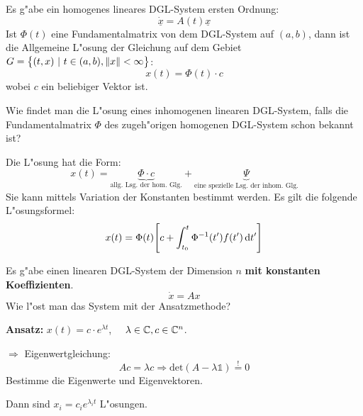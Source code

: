 \documentclass[9pt]{article}
\newcommand{\C}[1]{%
	\ifthenelse{\equal{#1}{}}
	{\mathbb{C}}
	{\mathbb{C}^{#1}}}%
\renewcommand{\vec}[1]{\underline{#1}}
\newenvironment{field}{}{\newpage}
\newif\ifnote
\newenvironment{note}{\notetrue}{\notefalse}
\newcommand{\localtag}{}
\newcommand{\globaltag}{}
\newcommand{\uuid}{}
\newcommand{\tags}[1]{
    \ifnote 
        \renewcommand{\localtag}{#1}
    \else
        \renewcommand{\globaltag}{#1}
    \fi 
    }
\newcommand{\xplain}[1]{\renewcommand{\uuid}{#1}}
\begin{document}
\begin{note}
	\begin{field}  %
		Es g"abe ein homogenes lineares DGL-System  ersten Ordnung:
		\begin{equation*}
		\dot{\vec{x}} = A(t)\vec{x} 
		\end{equation*}
		Ist $\Phi(t)$ eine Fundamentalmatrix von dem DGL-System auf $(a,b)$, dann ist die Allgemeine L"osung der Gleichung auf dem Gebiet $G=\qty{(t,x) \ | \ t\in(a,b), \norm{x} < \infty}$:
		\begin{equation*}
			x(t)= \Phi(t) \cdot c
		\end{equation*}
		wobei $c$ ein beliebiger Vektor ist. 
	\end{field}
\end{note}
	\begin{note}
		\xplain{UUID}
		\tags{LDGL, inhomogen,3.8.7}
		
		\begin{field}  %
			Wie findet man die L"osung eines inhomogenen linearen  DGL-System, falls die Fundamentalmatrix $\Phi$ des zugeh"origen homogenen DGL-System schon bekannt ist?
		\end{field}
		
		\begin{field}  %
			Die L"osung hat die Form:
			\begin{equation*}
				x(t) = \underbrace{\Phi\cdot c}_{\text{allg. Lsg.  der hom. Glg.}} + \underbrace{\Psi}_{\text{eine spezielle Lsg. der inhom. Glg.}}
			\end{equation*}
			Sie kann mittels Variation der Konstanten bestimmt werden. Es gilt die folgende L"osungsformel:
			\begin{equation*}
				x(t) = \Phi(t)\qty[c + \int_{t_0}^{t}\Phi^{-1}(t')f(t')\dif t']
			\end{equation*}
		\end{field}
	\end{note}
	\begin{note}
		\xplain{UUID}
		\tags{LDGLS, konstante-koeffizienten, 3.9}
		
		\begin{field}  %
			Es g"abe einen linearen DGL-System der Dimension $n$
			\textbf{mit konstanten Koeffizienten}.
			\begin{equation*}
				\dot{x} = Ax
			\end{equation*}
			Wie l"ost man  das System mit der Ansatzmethode? 
		\end{field}
		
		\begin{field}  %
	
			\textbf{Ansatz:} $x(t)= c \cdot e^{\lambda t}$,
				$\quad \lambda\in \C{}, c\in \C{n}$.
			
			
			$\Rightarrow$ Eigenwertgleichung:
			\begin{equation*}
				Ac = \lambda c \Rightarrow \text{det}(A - \lambda \mathbb{1}) \overset{!}{=} 0
			\end{equation*}
			Bestimme die Eigenwerte und Eigenvektoren.
			
			Dann sind $x_i = c_ie^{\lambda_i t}$ L"osungen.
		\end{field}
		\end{note}
\end{document}
